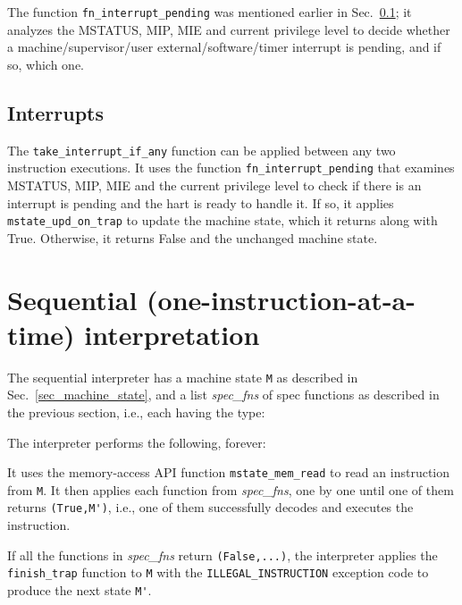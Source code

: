 \documentclass[11pt]{article}
\newcommand{\hmm}{\hspace*{2em}}
\newcommand{\hmmm}{\hspace*{3em}}
\begin{document}
The function \verb|fn_interrupt_pending| was mentioned earlier in
Sec.~\ref{sec_interrupts}; it analyzes the MSTATUS, MIP, MIE and
current privilege level to decide whether a machine/supervisor/user
external/software/timer interrupt is pending, and if so, which one.


\subsection{Interrupts}

\label{sec_interrupts}



The \verb|take_interrupt_if_any| function can be applied between any
two instruction executions. It uses the function
\verb|fn_interrupt_pending| that examines MSTATUS, MIP, MIE and the
current privilege level to check if there is an interrupt is pending
and the hart is ready to handle it.  If so, it applies
\verb|mstate_upd_on_trap| to update the machine state, which it
returns along with True.  Otherwise, it returns False and the
unchanged machine state.


\section{Sequential (one-instruction-at-a-time)  interpretation}

The sequential interpreter has a machine state \verb|M| as described
in Sec.~\ref{sec_machine_state}, and a list \emph{spec\_fns} of spec
functions as described in the previous section, i.e., each having the
type:

\hmmm {\tt Machine\_State -> Instr -> (Bool, Machine\_State)}

The interpreter performs the following, forever:

\hmm \begin{minipage}[t]{5in}

It uses the memory-access API function \verb|mstate_mem_read| to read
an instruction from \verb|M|.  It then applies each function from
\emph{spec\_fns}, one by one until one of them returns
\verb|(True,M')|, i.e., one of them successfully decodes and executes
the instruction.

\vspace*{1ex}

If all the functions in \emph{spec\_fns} return \verb|(False,...)|,
the interpreter applies the \verb|finish_trap| function to \verb|M|
with the \verb|ILLEGAL_INSTRUCTION| exception code to produce the next
state \verb|M'|.

\end{minipage}
\end{document}
